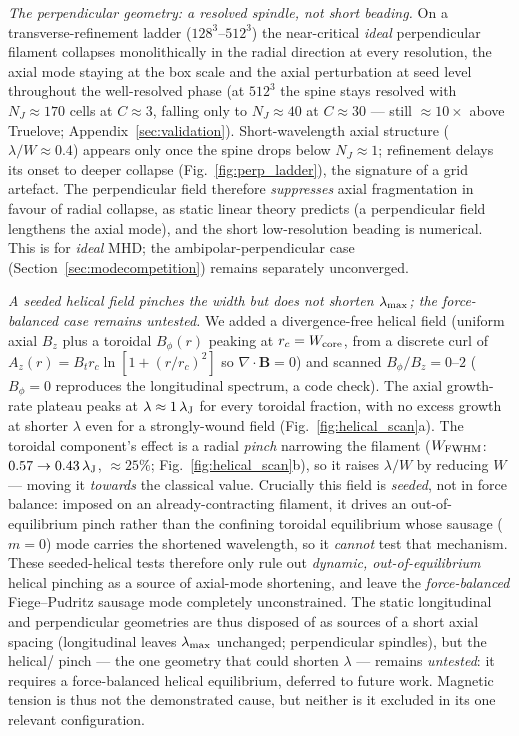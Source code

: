 \documentclass[usenatbib,twoside,twocolumn]{mnras}
\begin{document}
\emph{The perpendicular geometry: a resolved spindle, not short beading.} On a transverse-refinement ladder ($128^3$--$512^3$) the near-critical \emph{ideal} perpendicular filament collapses monolithically in the radial direction at every resolution, the axial mode staying at the box scale and the axial perturbation at seed level throughout the well-resolved phase (at $512^3$ the spine stays resolved with $N_J\approx170$ cells at $C\approx3$, falling only to $N_J\approx40$ at $C\approx30$ --- still $\approx10\times$ above Truelove; Appendix~\ref{sec:validation}). Short-wavelength axial structure ($\lambda/W\approx0.4$) appears only once the spine drops below $N_J\approx1$; refinement delays its onset to deeper collapse (Fig.~\ref{fig:perp_ladder}), the signature of a grid artefact. The perpendicular field therefore \emph{suppresses} axial fragmentation in favour of radial collapse, as static linear theory predicts (a perpendicular field lengthens the axial mode), and the short low-resolution beading is numerical. This is for \emph{ideal} MHD; the ambipolar-perpendicular case (Section~\ref{sec:modecompetition}) remains separately unconverged.

\emph{A seeded helical field pinches the width but does not shorten $\lambda_{\rm max}$; the force-balanced case remains untested.} We added a divergence-free helical field (uniform axial $B_z$ plus a toroidal $B_\phi(r)$ peaking at $r_c=W_{\rm core}$, from a discrete curl of $A_z(r)=B_t r_c\ln[1+(r/r_c)^2]$ so $\nabla\!\cdot\!\mathbf{B}=0$) and scanned $B_\phi/B_z=0$--$2$ ($B_\phi=0$ reproduces the longitudinal spectrum, a code check). The axial growth-rate plateau peaks at $\lambda\approx1\,\lambda_{\rm J}$ for every toroidal fraction, with no excess growth at shorter $\lambda$ even for a strongly-wound field (Fig.~\ref{fig:helical_scan}a). The toroidal component's effect is a radial \emph{pinch} narrowing the filament ($W_{\rm FWHM}$: $0.57\to0.43\,\lambda_{\rm J}$, $\approx25\%$; Fig.~\ref{fig:helical_scan}b), so it raises $\lambda/W$ by reducing $W$ --- moving it \emph{towards} the classical value. Crucially this field is \emph{seeded}, not in force balance: imposed on an already-contracting filament, it drives an out-of-equilibrium pinch rather than the confining toroidal equilibrium whose sausage ($m=0$) mode carries the shortened \citet{Fiege2000} wavelength, so it \emph{cannot} test that mechanism. These seeded-helical tests therefore only rule out \emph{dynamic, out-of-equilibrium} helical pinching as a source of axial-mode shortening, and leave the \emph{force-balanced} Fiege--Pudritz sausage mode completely unconstrained. The static longitudinal and perpendicular geometries are thus disposed of as sources of a short axial spacing (longitudinal leaves $\lambda_{\rm max}$ unchanged; perpendicular spindles), but the helical/\citet{Fiege2000} pinch --- the one geometry that could shorten $\lambda$ --- remains \emph{untested}: it requires a force-balanced helical equilibrium, deferred to future work. Magnetic tension is thus not the demonstrated cause, but neither is it excluded in its one relevant configuration.
\end{document}
